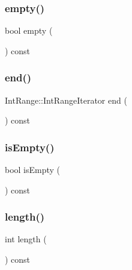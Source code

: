 \subsubsection{\texorpdfstring{empty()}{empty()}}
{\footnotesize\ttfamily bool empty (\begin{DoxyParamCaption}{ }\end{DoxyParamCaption}) const}

\mbox{\label{classIntRange_ad919bd40bd4298cafd0955b8031f4bef}} 
\subsubsection{\texorpdfstring{end()}{end()}}
{\footnotesize\ttfamily Int\+Range\+::\+Int\+Range\+Iterator end (\begin{DoxyParamCaption}{ }\end{DoxyParamCaption}) const}

\mbox{\label{classIntRange_acf82f9b2937375c7b1cf3dccb3df3312}} 
\subsubsection{\texorpdfstring{is\+Empty()}{isEmpty()}}
{\footnotesize\ttfamily bool is\+Empty (\begin{DoxyParamCaption}{ }\end{DoxyParamCaption}) const}

\mbox{\label{classIntRange_a91213974fa3ac3959b1c355a9e588f8d}} 
\subsubsection{\texorpdfstring{length()}{length()}}
{\footnotesize\ttfamily int length (\begin{DoxyParamCaption}{ }\end{DoxyParamCaption}) const}

\mbox{\label{classIntRange_a86ad4228f3fccc681e8716ac9c68ab4d}} 
